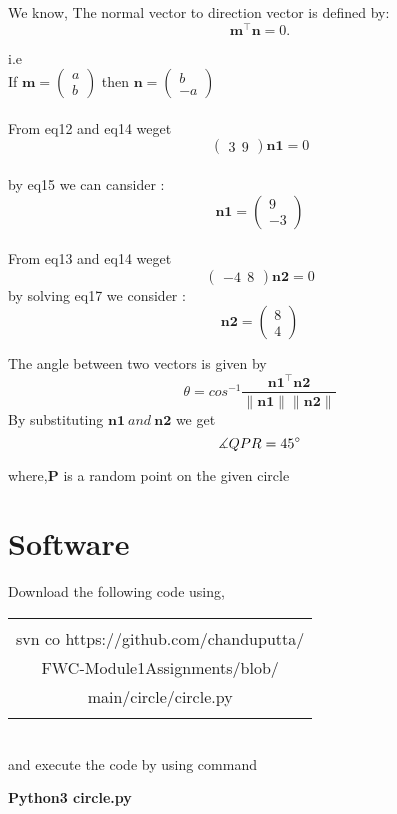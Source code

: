 \documentclass[journal,12pt,twocolumn]{article}
\newcommand{\myvec}[1]{\ensuremath{\begin{pmatrix}#1\end{pmatrix}}}
\let\vec\mathbf
\begin{document}
We know,
The normal vector to direction vector is defined by:
\begin{equation}
\vec{m^{\top}}\vec{n} = 0.
  \label{eq-14}
\end{equation} 

i.e
\\
If $\vec{m} = \myvec{a\\b}$ then $\vec{n} = \myvec{b\\-a}$
\\
\\
From eq12 and eq14 weget
 \\
 \begin{equation}
	\myvec{3\ \ 9}
     \vec{n1}= 0
  \label{eq-15}
\end{equation}
\\
by eq15 we can cansider :
\begin{equation}	
     \vec{n1}= \myvec{9\\ -3}
  \label{eq-16}
\end{equation}  
\\
From eq13 and eq14 weget
\begin{equation}
	\myvec{-4\ \ 8}
     \vec{n2} = 0
   \label{eq-17}
\end{equation}
by solving eq17 we consider :
\begin{equation}	
     \vec{n2}= \myvec{8\\ 4}
  \label{eq-18}
\end{equation}  

The angle between two vectors is given by
\begin{equation}
\theta = {cos}^{-1}\frac{\vec{n1^{\top}} \vec{n2}}{\vec{\|n1\| \|n2\|}}
   \label{eq-19}
\end{equation}
By substituting $\vec{n1} \:and\: \vec{n2} $ we get
\begin{equation}
 \measuredangle{QPR} = 45\degree
  \label{eq-20}
\end{equation}

where,$ \vec{P} $ is a random point on the given circle
 
\section{Software}
Download the following code using,
\begin{table}[h]
    \centering
    \begin{tabular}{|c|}
    \hline \\
         svn co https://github.com/chanduputta/\\FWC-Module1Assignments/blob/\\main/circle/circle.py  \\
         \\
\hline
    \end{tabular}
\end{table}
\\
and execute the code by using command
\begin{center}
\textbf{Python3  circle.py}
\\
\end{center}
\end{document}
